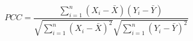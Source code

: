 \begin{equation}
    PCC = \frac{\sum_{i=1}^{n} (X_i - \bar{X})(Y_i - \bar{Y})}{\sqrt{\sum_{i=1}^{n} (X_i - \bar{X})^2} \sqrt{\sum_{i=1}^{n} (Y_i - \bar{Y})^2}}
    \label{eq:pearson}
\end{equation}
